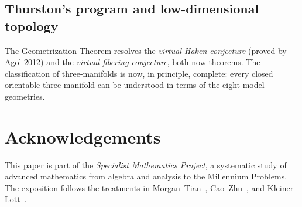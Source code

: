 \documentclass[12pt,a4paper]{amsart}
\theoremstyle{definition}
\theoremstyle{remark}
\begin{document}
\subsection{Thurston's program and low-dimensional topology}

The Geometrization Theorem resolves the \emph{virtual Haken conjecture} (proved by
Agol 2012) and the \emph{virtual fibering conjecture}, both now theorems.
The classification of three-manifolds is now, in principle, complete: every
closed orientable three-manifold can be understood in terms of the eight
model geometries.


\section*{Acknowledgements}

This paper is part of the \emph{Specialist Mathematics Project}, a systematic
study of advanced mathematics from algebra and analysis to the Millennium
Problems.  The exposition follows the treatments in Morgan--Tian~\cite{MorganTian2007},
Cao--Zhu~\cite{CaoZhu2006}, and Kleiner--Lott~\cite{KleinerLott2008}.
\end{document}
